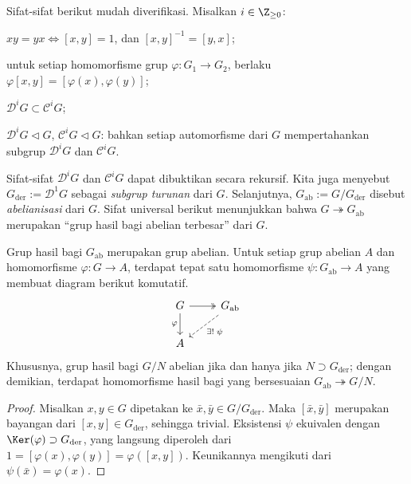 Sifat-sifat berikut mudah diverifikasi. Misalkan $i \in \Z_{\geq 0}$:
\begin{compactitem}
	\item $xy=yx \iff [x,y]=1$, dan $[x,y]^{-1} = [y,x]$;
	\item untuk setiap homomorfisme grup $\varphi: G_1 \to G_2$, berlaku $\varphi [x,y] = [\varphi(x), \varphi(y)]$;
	\item $\mathscr{D}^i G \subset \mathscr{C}^i G$;
	\item $\mathscr{D}^i G \lhd G$, $\mathscr{C}^i G \lhd G$: bahkan setiap automorfisme dari $G$ mempertahankan subgrup $\mathscr{D}^i G$ dan $\mathscr{C}^i G$.
\end{compactitem}
Sifat-sifat $\mathscr{D}^i G$ dan $\mathscr{C}^i G$ dapat dibuktikan secara rekursif. Kita juga menyebut $G_\text{der} := \mathscr{D}^1 G$ sebagai \emph{subgrup turunan} dari $G$. Selanjutnya, $G_\text{ab} := G/G_\text{der}$ disebut \emph{abelianisasi} dari $G$. Sifat universal berikut menunjukkan bahwa $G \twoheadrightarrow G_\text{ab}$ merupakan ``grup hasil bagi abelian terbesar'' dari $G$.  

\begin{lemma}\label{prop:abelianization}
	Grup hasil bagi $G_{\mathrm{ab}}$ merupakan grup abelian. Untuk setiap grup abelian $A$ dan homomorfisme $\varphi: G \to A$, terdapat tepat satu homomorfisme $\psi: G_{\mathrm{ab}} \to A$ yang membuat diagram berikut komutatif.
	\[ \begin{tikzcd}
		G \arrow[twoheadrightarrow, r] \arrow[d, "\varphi"'] & G_{\mathrm{ab}} \arrow[dashed, ld, "{\exists ! \; \psi}"] \\
		A &
	\end{tikzcd} \]
	Khususnya, grup hasil bagi $G/N$ abelian jika dan hanya jika $N \supset G_\text{der}$; dengan demikian, terdapat homomorfisme hasil bagi yang bersesuaian $G_{\mathrm{ab}} \twoheadrightarrow G/N$.
\end{lemma}
\begin{proof}
	Misalkan $x,y \in G$ dipetakan ke $\bar{x}, \bar{y} \in G/G_\text{der}$. Maka $[\bar{x}, \bar{y}]$ merupakan bayangan dari $[x,y] \in G_\text{der}$, sehingga trivial. Eksistensi $\psi$ ekuivalen dengan $\Ker(\varphi) \supset G_\text{der}$, yang langsung diperoleh dari $1 = [\varphi(x), \varphi(y)] = \varphi([x,y])$. Keunikannya mengikuti dari $\psi(\bar{x}) = \varphi(x)$.
\end{proof}

